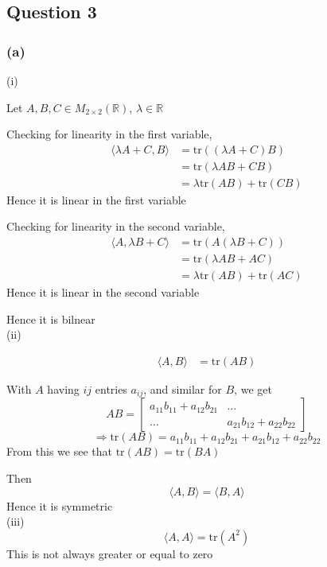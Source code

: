 \documentclass{article}
\begin{document}
\subsection*{Question 3}
\subsubsection*{(a)}
(i)

Let \(A,B,C \in M_{2\times 2}(\mathbb{R})\), \(\lambda \in \mathbb{R}\)

Checking for linearity in the first variable, 
\begin{align*}
    \langle \lambda A + C , B\rangle &= \mathrm{tr}((\lambda A + C)B) \\
    &= \mathrm{tr}(\lambda AB + CB) \\
    &= \lambda \mathrm{tr}(AB) + \mathrm{tr}(CB)
\end{align*}
Hence it is linear in the first variable

Checking for linearity in the second variable, 
\begin{align*}
    \langle  A , \lambda B + C\rangle &= \mathrm{tr}(A(\lambda B + C)) \\
    &= \mathrm{tr}(\lambda AB + AC) \\
    &= \lambda \mathrm{tr}(AB) + \mathrm{tr}(AC)
\end{align*}
Hence it is linear in the second variable

Hence it is bilnear
\\

(ii)

\begin{align*}
    \langle A,B \rangle &= \mathrm{tr}(AB)
\end{align*}

With \(A\) having \(ij\) entries \(a_{ij}\), and similar for \(B\), we get 
\[
AB = \begin{bmatrix}
    a_{11}b_{11} + a_{12}b_{21} & \dots \\
    \dots & a_{21}b_{12} + a_{22}b_{22}
\end{bmatrix}
\]
\[
\Rightarrow \mathrm{tr}(AB) = a_{11}b_{11} + a_{12}b_{21} + a_{21}b_{12} + a_{22}b_{22}
\]
From this we see that \(\mathrm{tr}(AB) = \mathrm{tr}(BA)\)

Then
\[
\langle A,B \rangle = \langle B,A \rangle
\]
Hence it is symmetric
\\

(iii)
\[
\langle A,A \rangle = \mathrm{tr}(A^2)
\]
This is not always greater or equal to zero
\end{document}
